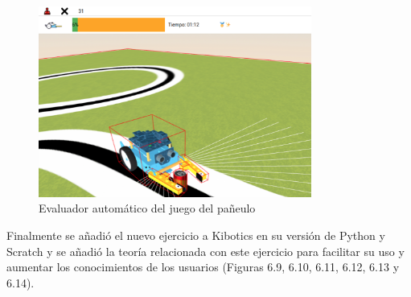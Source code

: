 \begin{figure}[H]
  \centering
 \includegraphics[width=0.8\textwidth, height=0.5\textwidth]{chapters/images/evaluadorpinza.png}
  \caption{Evaluador automático del juego del pañeulo}
\end{figure}

Finalmente se añadió el nuevo ejercicio a Kibotics en su versión de Python y Scratch y se añadió la teoría relacionada con este ejercicio para facilitar su uso y aumentar los conocimientos de los usuarios (Figuras 6.9, 6.10, 6.11, 6.12, 6.13 y 6.14).


